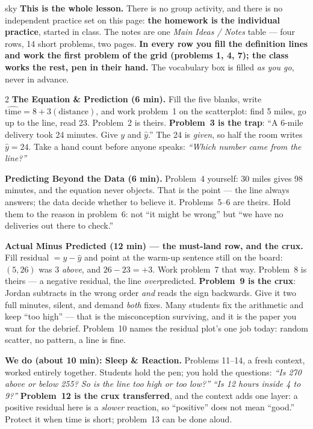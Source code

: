 \documentclass[10pt]{article}
\begin{document}
\boxguard
\begin{skillbox}{sky}
\textbf{This is the whole lesson.} There is no group activity, and there is no independent
practice set on this page: \textbf{the homework is the individual practice}, started in class.
The notes are one \emph{Main Ideas / Notes} table --- four rows, 14 short problems, two pages.
\textbf{In every row you fill the definition lines and work the first problem of the grid
(problems 1, 4, 7); the class works the rest, pen in their hand.} The vocabulary box is filled
\emph{as you go}, never in advance.
\begin{multicols}{2}
\textbf{The Equation \& Prediction (6 min).} Fill the five blanks, write
$\widehat{\text{time}} = 8 + 3(\text{distance})$, and work problem~1 on the scatterplot:
find 5 miles, go up to the line, read 23. Problem~2 is theirs. \textbf{Problem~3 is the trap}:
``A 6-mile delivery took 24 minutes. Give $y$ and $\hat{y}$.'' The 24 is \emph{given}, so half
the room writes $\hat{y} = 24$. Take a hand count before anyone speaks: \emph{``Which number came
from the line?''}

\textbf{Predicting Beyond the Data (6 min).} Problem~4 yourself: 30 miles gives 98 minutes, and
the equation never objects. That is the point --- the line always answers; the data decide
whether to believe it. Problems~5--6 are theirs. Hold them to the reason in problem~6: not ``it
might be wrong'' but ``we have no deliveries out there to check.''

\textbf{Actual Minus Predicted (12 min) --- the must-land row, and the crux.} Fill
residual $= y - \hat{y}$ and point at the warm-up sentence still on the board: $(5,26)$ was 3
\emph{above}, and $26 - 23 = +3$. Work problem~7 that way. Problem~8 is theirs --- a negative
residual, the line \emph{over}predicted. \textbf{Problem~9 is the crux}: Jordan subtracts in
the wrong order \emph{and} reads the sign backwards. Give it two full minutes, silent, and
demand \emph{both} fixes. Many students fix the arithmetic and keep ``too high'' --- that is
the misconception surviving, and it is the paper you want for the debrief. Problem~10 names the
residual plot's one job today: random scatter, no pattern, a line is fine.

\columnbreak
\textbf{We do (about 10 min): Sleep \& Reaction.} Problems 11--14, a fresh context, worked
entirely together. Students hold the pen; you hold the questions: \emph{``Is 270 above or below
255? So is the line too high or too low?''} \quad \emph{``Is 12 hours inside 4 to 9?''}
\textbf{Problem~12 is the crux transferred}, and the context adds one layer: a positive
residual here is a \emph{slower} reaction, so ``positive'' does not mean ``good.'' Protect it
when time is short; problem~13 can be done aloud.


\end{multicols}
\end{skillbox}
\end{document}
